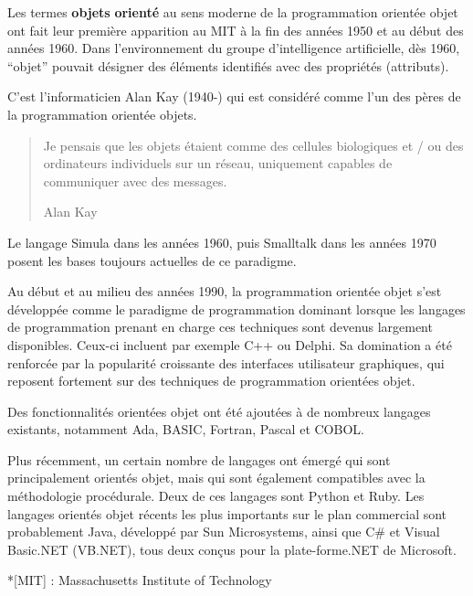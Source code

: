 \documentclass[
  french,
  letterpaper,
  DIV=11,
  numbers=noendperiod]{scrartcl}
\begin{document}
\begin{tcolorbox}[enhanced jigsaw, breakable, title=\textcolor{quarto-callout-note-color}{\faInfo}\hspace{0.5em}{Un peu d'histoire}, toptitle=1mm, coltitle=black, colback=white, left=2mm, colbacktitle=quarto-callout-note-color!10!white, opacityback=0, opacitybacktitle=0.6, bottomtitle=1mm, colframe=quarto-callout-note-color-frame, bottomrule=.15mm, rightrule=.15mm, arc=.35mm, titlerule=0mm, toprule=.15mm, leftrule=.75mm]

Les termes \textbf{objets} \textbf{orienté} au sens moderne de la
programmation orientée objet ont fait leur première apparition au MIT à
la fin des années 1950 et au début des années 1960. Dans l'environnement
du groupe d'intelligence artificielle, dès 1960, ``objet'' pouvait
désigner des éléments identifiés avec des propriétés (attributs).

C'est l'informaticien Alan Kay (1940-) qui est considéré comme l'un des
pères de la programmation orientée objets.

\begin{quote}
Je pensais que les objets étaient comme des cellules biologiques et / ou
des ordinateurs individuels sur un réseau, uniquement capables de
communiquer avec des messages.

Alan Kay
\end{quote}

Le langage Simula dans les années 1960, puis Smalltalk dans les années
1970 posent les bases toujours actuelles de ce paradigme.

Au début et au milieu des années 1990, la programmation orientée objet
s'est développée comme le paradigme de programmation dominant lorsque
les langages de programmation prenant en charge ces techniques sont
devenus largement disponibles. Ceux-ci incluent par exemple C++ ou
Delphi. Sa domination a été renforcée par la popularité croissante des
interfaces utilisateur graphiques, qui reposent fortement sur des
techniques de programmation orientées objet.

Des fonctionnalités orientées objet ont été ajoutées à de nombreux
langages existants, notamment Ada, BASIC, Fortran, Pascal et COBOL.

Plus récemment, un certain nombre de langages ont émergé qui sont
principalement orientés objet, mais qui sont également compatibles avec
la méthodologie procédurale. Deux de ces langages sont Python et Ruby.
Les langages orientés objet récents les plus importants sur le plan
commercial sont probablement Java, développé par Sun Microsystems, ainsi
que C\# et Visual Basic.NET (VB.NET), tous deux conçus pour la
plate-forme.NET de Microsoft.

*{[}MIT{]} : Massachusetts Institute of Technology

\end{tcolorbox}
\end{document}
